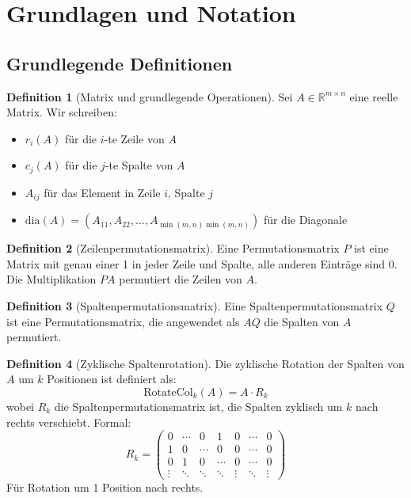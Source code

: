 \documentclass[a4paper,12pt]{article}
\theoremstyle{definition}
\newtheorem{definition}{Definition}
\begin{document}
\section{Grundlagen und Notation}

\subsection{Grundlegende Definitionen}

\begin{definition}[Matrix und grundlegende Operationen]
	Sei $A \in \mathbb{R}^{m \times n}$ eine reelle Matrix. Wir schreiben:
	\begin{itemize}
		\item $r_i(A)$ für die $i$-te Zeile von $A$
		\item $c_j(A)$ für die $j$-te Spalte von $A$
		\item $A_{ij}$ für das Element in Zeile $i$, Spalte $j$
		\item $\text{dia}(A) = (A_{11}, A_{22}, \ldots, A_{\min(m,n)\min(m,n)})$ für die Diagonale
	\end{itemize}
\end{definition}

\begin{definition}[Zeilenpermutationsmatrix]
	Eine Permutationsmatrix $P$ ist eine Matrix mit genau einer 1 in jeder Zeile und Spalte, alle anderen Einträge sind 0. Die Multiplikation $PA$ permutiert die Zeilen von $A$.
\end{definition}

\begin{definition}[Spaltenpermutationsmatrix]
	Eine Spaltenpermutationsmatrix $Q$ ist eine Permutationsmatrix, die angewendet als $AQ$ die Spalten von $A$ permutiert.
\end{definition}

\begin{definition}[Zyklische Spaltenrotation]
	Die zyklische Rotation der Spalten von $A$ um $k$ Positionen ist definiert als:
	\[
	\text{RotateCol}_k(A) = A \cdot R_k
	\]
	wobei $R_k$ die Spaltenpermutationsmatrix ist, die Spalten zyklisch um $k$ nach rechts verschiebt. Formal:
	\[
	R_k = \begin{pmatrix}
		0 & \cdots & 0 & 1 & 0 & \cdots & 0 \\
		1 & 0 & \cdots & 0 & 0 & \cdots & 0 \\
		0 & 1 & 0 & \cdots & 0 & \cdots & 0 \\
		\vdots & \ddots & \ddots & \ddots & \vdots & \ddots & \vdots
	\end{pmatrix}
	\]
	Für Rotation um 1 Position nach rechts.
\end{definition}
\end{document}
